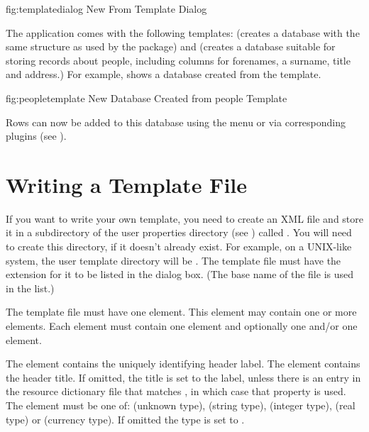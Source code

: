 \FloatFig
 {fig:templatedialog}
 {%
 }
 {New From Template Dialog}

   The  application comes with the following templates: 
    (creates a database with the same structure as
   used by the  package) and  (creates
   a database suitable for storing records about people, including
   columns for forenames, a surname, title and address.) For example,
    shows a database created from the 
    template.

\FloatFig
 {fig:peopletemplate}
 {%
 }
 {New Database Created from people Template}


   Rows can now be added to this database using the 
   menu or via corresponding plugins (see ).


\section{Writing a Template File}\label{sec:writingtemplates}

   If you want to write your own template, you need to create an XML file
   and store it in a subdirectory  of the  
   user properties directory (see ) called 
   . You will need to create this directory, if it doesn't
   already exist. For example, on a UNIX-like system, the user
   template directory will be .
   The template file must have the extension  for it to be
   listed in the  dialog box. (The base
   name of the file is used in the list.)

   The template file must have one  element. This
   element may contain one or more  elements. Each 
    element must contain one  element and 
   optionally one  and/or one  element.


   The  element contains the uniquely identifying header label.
   The  element contains the header title. If omitted, the
   title is set to the label, unless there is an entry in the resource
   dictionary file that matches , 
   in which case that property is used. The  element must be one of:
    (unknown type),  (string type), (integer 
   type),  (real type) or  (currency type). If omitted the 
   type is set to .

